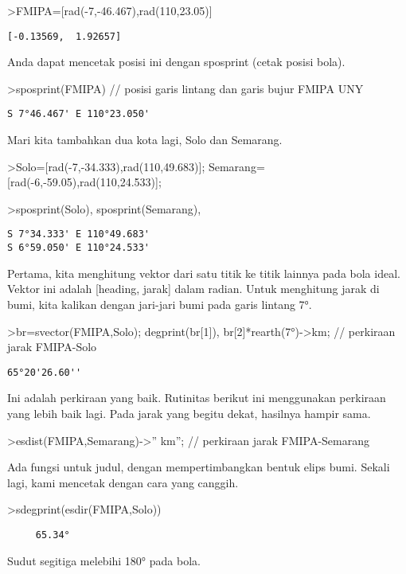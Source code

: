 \documentclass[
]{book}
\begin{document}
\textgreater FMIPA={[}rad(-7,-46.467),rad(110,23.05){]}

\begin{verbatim}
[-0.13569,  1.92657]
\end{verbatim}

Anda dapat mencetak posisi ini dengan sposprint (cetak posisi bola).

\textgreater sposprint(FMIPA) // posisi garis lintang dan garis bujur FMIPA UNY

\begin{verbatim}
S 7°46.467' E 110°23.050'
\end{verbatim}

Mari kita tambahkan dua kota lagi, Solo dan Semarang.

\textgreater Solo={[}rad(-7,-34.333),rad(110,49.683){]}; Semarang={[}rad(-6,-59.05),rad(110,24.533){]};

\textgreater sposprint(Solo), sposprint(Semarang),

\begin{verbatim}
S 7°34.333' E 110°49.683'
S 6°59.050' E 110°24.533'
\end{verbatim}

Pertama, kita menghitung vektor dari satu titik ke titik lainnya pada bola ideal. Vektor ini adalah {[}heading, jarak{]} dalam radian. Untuk menghitung jarak di bumi, kita kalikan dengan jari-jari bumi pada garis lintang 7°.

\textgreater br=svector(FMIPA,Solo); degprint(br{[}1{]}), br{[}2{]}*rearth(7°)-\textgreater km; // perkiraan jarak FMIPA-Solo

\begin{verbatim}
65°20'26.60''
\end{verbatim}

Ini adalah perkiraan yang baik. Rutinitas berikut ini menggunakan perkiraan yang lebih baik lagi. Pada jarak yang begitu dekat, hasilnya hampir sama.

\textgreater esdist(FMIPA,Semarang)-\textgreater'' km''; // perkiraan jarak FMIPA-Semarang

Ada fungsi untuk judul, dengan mempertimbangkan bentuk elips bumi. Sekali lagi, kami mencetak dengan cara yang canggih.

\textgreater sdegprint(esdir(FMIPA,Solo))

\begin{verbatim}
     65.34°
\end{verbatim}

Sudut segitiga melebihi 180° pada bola.
\end{document}
